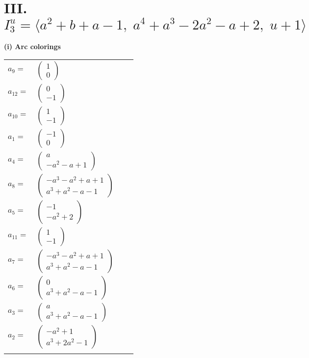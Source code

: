 \documentclass[1p]{elsarticle_modified}
\theoremstyle{definition}
\begin{document}
\centering \section*{III. $I^u_{3}= \langle a^2+b+a-1,\;a^4+a^3-2 a^2- a+2,\;u+1 \rangle$}
\flushleft \textbf{(i) Arc colorings}\\
\begin{tabular}{m{7pt} m{180pt} m{7pt} m{180pt} }
\flushright $a_{9}=$&$\begin{pmatrix}1\\0\end{pmatrix}$ \\
\flushright $a_{12}=$&$\begin{pmatrix}0\\-1\end{pmatrix}$ \\
\flushright $a_{10}=$&$\begin{pmatrix}1\\-1\end{pmatrix}$ \\
\flushright $a_{1}=$&$\begin{pmatrix}-1\\0\end{pmatrix}$ \\
\flushright $a_{4}=$&$\begin{pmatrix}a\\- a^2- a+1\end{pmatrix}$ \\
\flushright $a_{8}=$&$\begin{pmatrix}- a^3- a^2+a+1\\a^3+a^2- a-1\end{pmatrix}$ \\
\flushright $a_{5}=$&$\begin{pmatrix}-1\\- a^2+2\end{pmatrix}$ \\
\flushright $a_{11}=$&$\begin{pmatrix}1\\-1\end{pmatrix}$ \\
\flushright $a_{7}=$&$\begin{pmatrix}- a^3- a^2+a+1\\a^3+a^2- a-1\end{pmatrix}$ \\
\flushright $a_{6}=$&$\begin{pmatrix}0\\a^3+a^2- a-1\end{pmatrix}$ \\
\flushright $a_{3}=$&$\begin{pmatrix}a\\a^3+a^2- a-1\end{pmatrix}$ \\
\flushright $a_{2}=$&$\begin{pmatrix}- a^2+1\\a^3+2 a^2-1\end{pmatrix}$\\&\end{tabular}
\end{document}
